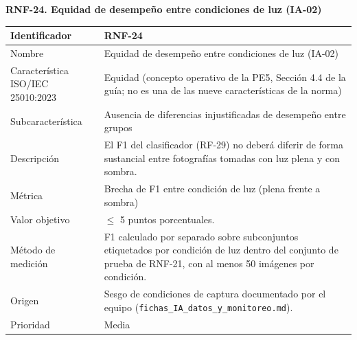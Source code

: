 \documentclass[12pt,a4paper]{article}
\begin{document}
\begin{minipage}{\linewidth}
\bigskip
\noindent\textbf{RNF-24. Equidad de desempeño entre condiciones de luz (IA-02)}
\label{tab:RNF-24}

\begin{center}
\begin{tabular}{|p{4.2cm}|p{10cm}|}
\hline
Identificador & RNF-24 \\
\hline
Nombre & Equidad de desempeño entre condiciones de luz (IA-02) \\
\hline
Característica ISO/IEC 25010:2023 & Equidad (concepto operativo de la PE5, Sección 4.4 de la guía; no es una de las nueve características de la norma) \\
\hline
Subcaracterística & Ausencia de diferencias injustificadas de desempeño entre grupos \\
\hline
Descripción & El F1 del clasificador (RF-29) no deberá diferir de forma sustancial entre fotografías tomadas con luz plena y con sombra. \\
\hline
Métrica & Brecha de F1 entre condición de luz (plena frente a sombra) \\
\hline
Valor objetivo & $\leq$ 5 puntos porcentuales. \\
\hline
Método de medición & F1 calculado por separado sobre subconjuntos etiquetados por condición de luz dentro del conjunto de prueba de RNF-21, con al menos 50 imágenes por condición. \\
\hline
Origen & Sesgo de condiciones de captura documentado por el equipo (\texttt{fichas\_IA\_datos\_y\_monitoreo.md}). \\
\hline
Prioridad & Media \\
\hline
\end{tabular}
\end{center}
\end{minipage}
\end{document}
